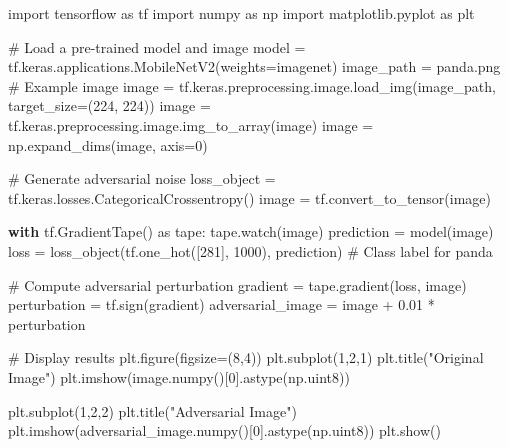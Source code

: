 \documentclass[
  letterpaper,
  DIV=11,
  numbers=noendperiod]{scrreprt}
\newenvironment{Shaded}{\begin{snugshade}}{\end{snugshade}}
\newcommand{\CommentTok}[1]{\textcolor[rgb]{0.37,0.37,0.37}{#1}}
\newcommand{\ControlFlowTok}[1]{\textcolor[rgb]{0.00,0.23,0.31}{\textbf{#1}}}
\newcommand{\DecValTok}[1]{\textcolor[rgb]{0.68,0.00,0.00}{#1}}
\newcommand{\FloatTok}[1]{\textcolor[rgb]{0.68,0.00,0.00}{#1}}
\newcommand{\ImportTok}[1]{\textcolor[rgb]{0.00,0.46,0.62}{#1}}
\newcommand{\NormalTok}[1]{\textcolor[rgb]{0.00,0.23,0.31}{#1}}
\newcommand{\OperatorTok}[1]{\textcolor[rgb]{0.37,0.37,0.37}{#1}}
\newcommand{\StringTok}[1]{\textcolor[rgb]{0.13,0.47,0.30}{#1}}
\begin{document}
\begin{Shaded}
\begin{Highlighting}[]
\ImportTok{import}\NormalTok{ tensorflow }\ImportTok{as}\NormalTok{ tf}
\ImportTok{import}\NormalTok{ numpy }\ImportTok{as}\NormalTok{ np}
\ImportTok{import}\NormalTok{ matplotlib.pyplot }\ImportTok{as}\NormalTok{ plt}

\CommentTok{\# Load a pre{-}trained model and image}
\NormalTok{model }\OperatorTok{=}\NormalTok{ tf.keras.applications.MobileNetV2(weights}\OperatorTok{=}\StringTok{\textquotesingle{}imagenet\textquotesingle{}}\NormalTok{)}
\NormalTok{image\_path }\OperatorTok{=} \StringTok{\textquotesingle{}panda.png\textquotesingle{}}  \CommentTok{\# Example image}
\NormalTok{image }\OperatorTok{=}\NormalTok{ tf.keras.preprocessing.image.load\_img(image\_path, target\_size}\OperatorTok{=}\NormalTok{(}\DecValTok{224}\NormalTok{, }\DecValTok{224}\NormalTok{))}
\NormalTok{image }\OperatorTok{=}\NormalTok{ tf.keras.preprocessing.image.img\_to\_array(image)}
\NormalTok{image }\OperatorTok{=}\NormalTok{ np.expand\_dims(image, axis}\OperatorTok{=}\DecValTok{0}\NormalTok{)}

\CommentTok{\# Generate adversarial noise}
\NormalTok{loss\_object }\OperatorTok{=}\NormalTok{ tf.keras.losses.CategoricalCrossentropy()}
\NormalTok{image }\OperatorTok{=}\NormalTok{ tf.convert\_to\_tensor(image)}

\ControlFlowTok{with}\NormalTok{ tf.GradientTape() }\ImportTok{as}\NormalTok{ tape:}
\NormalTok{    tape.watch(image)}
\NormalTok{    prediction }\OperatorTok{=}\NormalTok{ model(image)}
\NormalTok{    loss }\OperatorTok{=}\NormalTok{ loss\_object(tf.one\_hot([}\DecValTok{281}\NormalTok{], }\DecValTok{1000}\NormalTok{), prediction)  }\CommentTok{\# Class label for \textquotesingle{}panda\textquotesingle{}}

\CommentTok{\# Compute adversarial perturbation}
\NormalTok{gradient }\OperatorTok{=}\NormalTok{ tape.gradient(loss, image)}
\NormalTok{perturbation }\OperatorTok{=}\NormalTok{ tf.sign(gradient)}
\NormalTok{adversarial\_image }\OperatorTok{=}\NormalTok{ image }\OperatorTok{+} \FloatTok{0.01} \OperatorTok{*}\NormalTok{ perturbation}

\CommentTok{\# Display results}
\NormalTok{plt.figure(figsize}\OperatorTok{=}\NormalTok{(}\DecValTok{8}\NormalTok{,}\DecValTok{4}\NormalTok{))}
\NormalTok{plt.subplot(}\DecValTok{1}\NormalTok{,}\DecValTok{2}\NormalTok{,}\DecValTok{1}\NormalTok{)}
\NormalTok{plt.title(}\StringTok{"Original Image"}\NormalTok{)}
\NormalTok{plt.imshow(image.numpy()[}\DecValTok{0}\NormalTok{].astype(np.uint8))}

\NormalTok{plt.subplot(}\DecValTok{1}\NormalTok{,}\DecValTok{2}\NormalTok{,}\DecValTok{2}\NormalTok{)}
\NormalTok{plt.title(}\StringTok{"Adversarial Image"}\NormalTok{)}
\NormalTok{plt.imshow(adversarial\_image.numpy()[}\DecValTok{0}\NormalTok{].astype(np.uint8))}
\NormalTok{plt.show()}
\end{Highlighting}
\end{Shaded}
\end{document}
